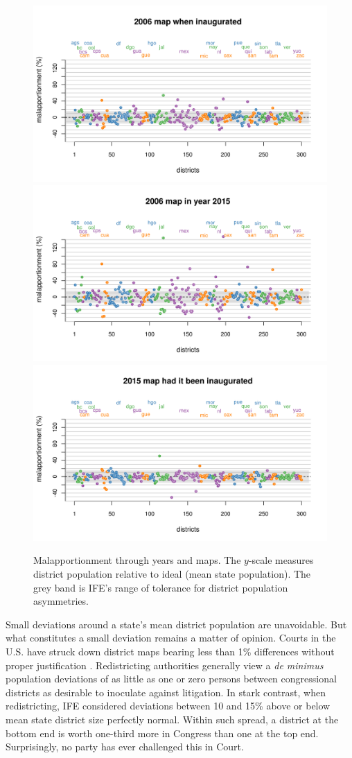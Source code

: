 \documentclass[letter,12pt]{article}
\begin{document}
\begin{figure}
\begin{center}
    \includegraphics[width=.7\columnwidth]{malapp2006d0.pdf} \\
    \includegraphics[width=.7\columnwidth]{malapp2015d0.pdf} \\
    \includegraphics[width=.7\columnwidth]{malapp2015d3.pdf} \\
  \caption{Malapportionment through years and maps. The $y$-scale measures district population relative to ideal (mean state population). The grey band is IFE's range of tolerance for district population asymmetries.}\label{F:malapp}
\end{center}
\end{figure}

Small deviations around a state's mean district population are unavoidable. But what constitutes a small deviation remains a matter of opinion. Courts in the U.S. have struck down district maps bearing less than 1\% differences without proper justification \citep{tuckerApportionment.1985}. Redistricting authorities generally view a \emph{de minimus} population deviations of as little as one or zero persons between congressional districts as desirable to inoculate against litigation. In stark contrast, when redistricting, IFE considered deviations between 10 and 15\% above or below mean state district size perfectly normal. Within such spread, a district at the bottom end is worth one-third more in Congress than one at the top end. Surprisingly, no party has ever challenged this in Court. 
\end{document}

